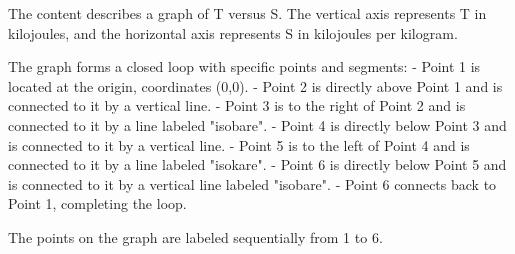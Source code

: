 The content describes a graph of T versus S. The vertical axis represents T in kilojoules, and the horizontal axis represents S in kilojoules per kilogram.

The graph forms a closed loop with specific points and segments:
- Point 1 is located at the origin, coordinates (0,0).
- Point 2 is directly above Point 1 and is connected to it by a vertical line.
- Point 3 is to the right of Point 2 and is connected to it by a line labeled "isobare".
- Point 4 is directly below Point 3 and is connected to it by a vertical line.
- Point 5 is to the left of Point 4 and is connected to it by a line labeled "isokare".
- Point 6 is directly below Point 5 and is connected to it by a vertical line labeled "isobare".
- Point 6 connects back to Point 1, completing the loop.

The points on the graph are labeled sequentially from 1 to 6.